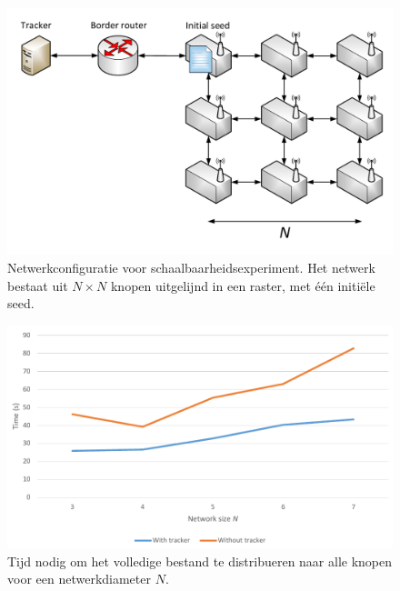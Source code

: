 \documentclass[journal]{IEEEtran}
\begin{document}
\begin{figure}
    \centering
    \includegraphics[width=\linewidth]{diagrams/experiment-scale.pdf}
    \caption{Netwerkconfiguratie voor schaalbaarheidsexperiment. Het netwerk bestaat uit $N \times N$ knopen uitgelijnd in een raster, met \'e\'en initi\"ele seed.}
    \label{fig:eval:scale:setup}
\end{figure}

\begin{figure}
    \centering
    \includegraphics[width=\linewidth]{graphs/scale/deploy-time.pdf}
    \caption{Tijd nodig om het volledige bestand te distribueren naar alle knopen voor een netwerkdiameter $N$.}
    \label{fig:eval:scale:deploy-time}
\end{figure}
\end{document}
